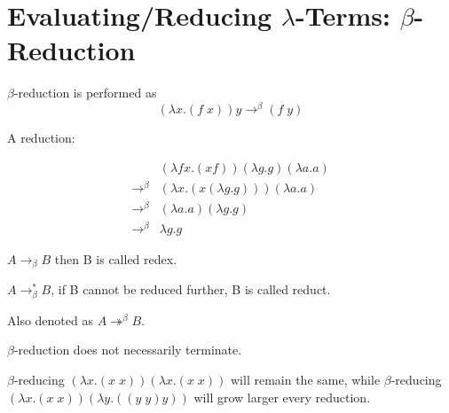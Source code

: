 \section{Evaluating/Reducing \texorpdfstring{\(\lambda\)}{λ}-Terms: \texorpdfstring{\(\beta\)}{β}-Reduction}

\begin{definition}
$\beta$-reduction is performed as 
$$(\lambda x.(f\;x)) y \rightarrow^{\beta} (f\;y)$$
\end{definition}

\begin{example}
A reduction:

\begin{align*}
&(\lambda f x.(x f))(\lambda g. g)(\lambda a.a)\\
\rightarrow^{\beta} &(\lambda x.(x (\lambda g.g)))(\lambda a.a)\\
\rightarrow^{\beta} &(\lambda a.a)(\lambda g.g) \\
\rightarrow^{\beta} &\lambda g.g
\end{align*}
\end{example}

\begin{definition}[redex]
\(A\rightarrow_{\beta} B\) then B is called redex.
\end{definition}

\begin{definition}[reduct]
\(A \rightarrow^*_{\beta} B\), if B cannot be reduced further, B is
called reduct. 

Also denoted as \(A \twoheadrightarrow^{\beta} B\).
\end{definition}



\(\beta\)-reduction does not necessarily terminate.

\begin{example}$\beta$-reducing \((\lambda x.(x\;x)) (\lambda x.(x\;x))\) will remain the same, while $\beta$-reducing \((\lambda x.(x\;x)) (\lambda y. ((y\;y)y))\) will grow larger every reduction.
\end{example}

